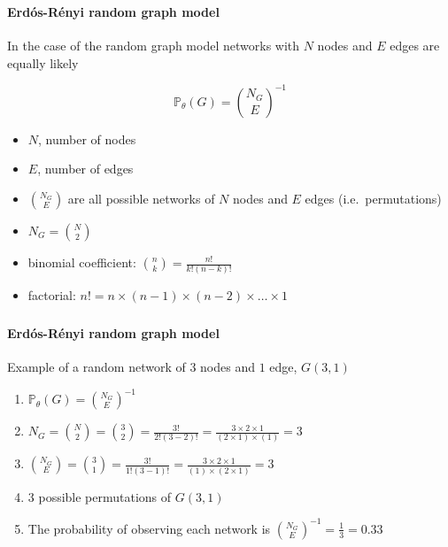 \documentclass[8pt]{beamer}
\begin{document}

\begin{frame}
\frametitle{\insertsection}
\framesubtitle{Erd\'os-R\'enyi random graph model}

In the case of the {\color{blue}{Erd\'os-R\'enyi}} random graph model networks with $N$ nodes and $E$ edges are equally likely


\begin{equation*}
\mathbb{P}_{\theta}(G)={\binom{N_{G}}{E}}^{-1}
\end{equation*}

\begin{itemize}
\item $N$, number of nodes
\item $E$, number of edges
\item $\binom{N_{G}}{E}$ are all possible networks of $N$ nodes and $E$ edges (i.e.\ permutations)
\item $N_{G}= \binom{N}{2}$
\item binomial coefficient: $\binom{n}{k}=\frac{n!}{k!(n-k)!}$
\item factorial: $n!=n\times(n-1)\times(n-2)\times\ldots\times1$
\end{itemize}


\end{frame}


\begin{frame}
\frametitle{\insertsection}
\framesubtitle{Erd\'os-R\'enyi random graph model}

Example of a random network of $3$ nodes and $1$ edge, $G(3,1)$

\medskip

\centering
{}

\begin{enumerate}[<+(3)->]
\item $\mathbb{P}_{\theta}(G)={\binom{N_{G}}{E}}^{-1}$
\item $N_{G}= \binom{N}{2} = \binom{3}{2} = \frac{3!}{2!(3-2)!}=\frac{3\times2\times1}{(2\times1)\times(1)}=3$
\item $\binom{N_{G}}{E} = \binom{3}{1} = \frac{3!}{1!(3-1)!}=\frac{3\times2\times1}{(1)\times(2\times1)}=3$
\item $3$ possible permutations of $G(3,1)$
\item The probability of observing each network is ${\binom{N_{G}}{E}}^{-1}=\frac{1}{3} = 0.33$
\end{enumerate}

\end{frame}
\end{document}
